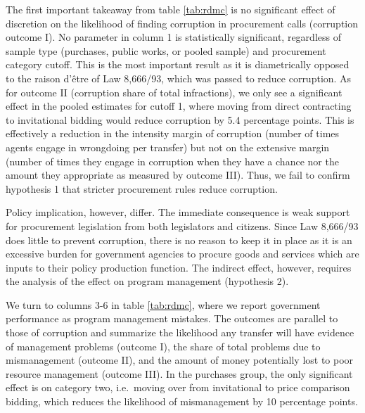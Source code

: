 \documentclass[11pt]{article}
\begin{document}
The first important takeaway from table \ref{tab:rdmc} is no significant effect of discretion on the likelihood of finding corruption in procurement calls (corruption outcome I). No parameter in column 1 is statistically significant, regardless of sample type (purchases, public works, or pooled sample) and procurement category cutoff. This is the most important result as it is diametrically opposed to the raison d'être of Law 8,666/93, which was passed to reduce corruption. As for outcome II (corruption share of total infractions), we only see a significant effect in the pooled estimates for cutoff 1, where moving from direct contracting to invitational bidding would reduce corruption by 5.4 percentage points. This is effectively a reduction in the intensity margin of corruption (number of times agents engage in wrongdoing per transfer) but not on the extensive margin (number of times they engage in corruption when they have a chance nor the amount they appropriate as measured by outcome III). Thus, we fail to confirm hypothesis 1 that stricter procurement rules reduce corruption.

Policy implication, however, differ. The immediate consequence is weak support for procurement legislation from both legislators and citizens. Since Law 8,666/93 does little to prevent corruption, there is no reason to keep it in place as it is an excessive burden for government agencies to procure goods and services which are inputs to their policy production function. The indirect effect, however, requires the analysis of the effect on program management (hypothesis 2).
\clearpage


We turn to columns 3-6 in table \ref{tab:rdmc}, where we report government performance as program management mistakes. The outcomes are parallel to those of corruption and summarize the likelihood any transfer will have evidence of management problems (outcome I), the share of total problems due to mismanagement (outcome II), and the amount of money potentially lost to poor resource management (outcome III). In the purchases group, the only significant effect is on category two, i.e.~moving over from invitational to price comparison bidding, which reduces the likelihood of mismanagement by 10 percentage points.
\end{document}
